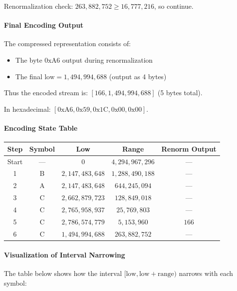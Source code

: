 Renormalization check: $263{,}882{,}752 \ge 16{,}777{,}216$, so continue.

\paragraph{Final Encoding Output}

The compressed representation consists of:
\begin{itemize}
    \item The byte $\text{0xA6}$ output during renormalization
    \item The final $\text{low} = 1{,}494{,}994{,}688$ (output as 4 bytes)
\end{itemize}

Thus the encoded stream is: $[166, 1{,}494{,}994{,}688]$ (5 bytes total).

In hexadecimal: $[\text{0xA6}, \text{0x59}, \text{0x1C}, \text{0x00}, \text{0x00}]$.

\paragraph{Encoding State Table}

\begin{center}
\begin{tabular}{c|c|c|c|c}
\hline
\textbf{Step} & \textbf{Symbol} & \textbf{Low} & \textbf{Range} & \textbf{Renorm Output} \\ \hline
Start & — & $0$ & $4{,}294{,}967{,}296$ & — \\
1 & B & $2{,}147{,}483{,}648$ & $1{,}288{,}490{,}188$ & — \\
2 & A & $2{,}147{,}483{,}648$ & $644{,}245{,}094$ & — \\
3 & C & $2{,}662{,}879{,}723$ & $128{,}849{,}018$ & — \\
4 & C & $2{,}765{,}958{,}937$ & $25{,}769{,}803$ & — \\
5 & C & $2{,}786{,}574{,}779$ & $5{,}153{,}960$ & $166$ \\
6 & C & $1{,}494{,}994{,}688$ & $263{,}882{,}752$ & — \\ \hline
\end{tabular}
\end{center}

\paragraph{Visualization of Interval Narrowing}

The table below shows how the interval $[\text{low}, \text{low}+\text{range})$ narrows with each symbol:

